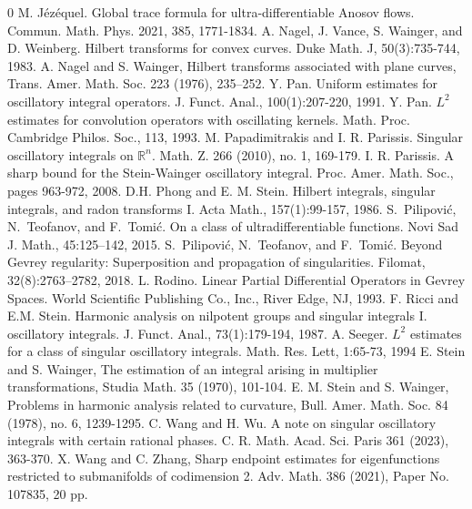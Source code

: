 \documentclass[11pt]{amsart}
\newcommand{\1}{{\rm 1\hspace*{-0.4ex}%
			\rule{0.1ex}{1.52ex}\hspace*{0.2ex}}}
\numberwithin{equation}{section}
\begin{document}
\begin{thebibliography}{0}
	M. Jézéquel. Global trace formula for ultra-differentiable Anosov flows. Commun. Math. Phys. 2021, 385, 1771-1834.
	A. Nagel, J. Vance, S. Wainger, and D. Weinberg. Hilbert transforms for convex curves. Duke Math.
	J, 50(3):735-744, 1983.
	A. Nagel and S. Wainger, Hilbert transforms associated with plane curves, Trans. Amer. Math. Soc. 223 (1976), 235--252.
	Y. Pan. Uniform estimates for oscillatory integral operators. J. Funct. Anal.,
	100(1):207-220, 1991.
	Y. Pan. $L^2$ estimates for convolution operators with oscillating kernels. Math. Proc. Cambridge Philos. Soc., 113, 1993.
	M. Papadimitrakis and I. R. Parissis. Singular oscillatory integrals on $\mathbb{R}^n$.
	Math. Z. 266 (2010), no. 1, 169-179.
	I. R. Parissis. A sharp bound for the Stein-Wainger oscillatory integral. Proc. Amer.
	Math. Soc., pages 963-972, 2008.
	D.H. Phong and E. M. Stein. Hilbert integrals, singular integrals, and radon transforms I. Acta Math., 157(1):99-157, 1986.
	S.~Pilipović, N.~Teofanov, and F.~Tomić. On a class of ultradifferentiable functions. Novi Sad J. Math., 45:125--142, 2015.
	S.~Pilipović, N.~Teofanov, and F.~Tomić. Beyond Gevrey regularity: Superposition and propagation of
	singularities. Filomat, 32(8):2763--2782, 2018.
	L. Rodino. Linear Partial Differential Operators in Gevrey Spaces. World Scientific Publishing Co., Inc., River Edge, NJ, 1993.
	F. Ricci and E.M. Stein. Harmonic analysis on nilpotent groups and singular integrals I. oscillatory
	integrals. J. Funct. Anal., 73(1):179-194, 1987.
	A. Seeger. $L^2$ estimates for a class of singular oscillatory integrals. Math. Res. Lett, 1:65-73, 1994
	E. Stein and S. Wainger, The estimation of an integral arising in multiplier transformations, Studia Math. 35 (1970), 101-104.
	E. M. Stein and S. Wainger, Problems in harmonic analysis related to curvature, Bull. Amer. Math. Soc. 84 (1978), no. 6, 1239-1295. 
	C. Wang and H. Wu. A note on singular oscillatory integrals with certain rational phases.
	C. R. Math. Acad. Sci. Paris 361 (2023), 363-370.
	X. Wang and C. Zhang, Sharp endpoint estimates for eigenfunctions restricted to submanifolds of codimension 2. Adv. Math. 386 (2021), Paper No. 107835, 20 pp.
\end{thebibliography}
\end{document}
